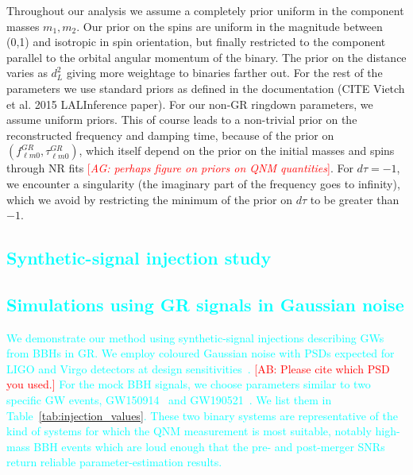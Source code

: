 \documentclass[twocolumn,prd,aps,superscriptaddress,preprintnumbers,tightenlines,showpacs,nofootinbib,eqsecnum,amsfonts,amsmath]{revtex4-1}
\newcommand{\abhi}[1]{\textcolor{red}{[\textit{AG: #1}]}}
\newcommand{\ab}[1]{\textcolor{cyan}{#1}}
\newcommand{\comment}[1]{\textcolor{red}{[#1]}}
\begin{document}
Throughout our analysis we assume a completely prior uniform in the component masses $m_1, m_2$. Our prior on the spins are uniform in the magnitude between (0,1) and isotropic in spin orientation, but finally restricted to the component parallel to the orbital angular momentum of the binary. The prior on the distance varies as $d_L^2$ giving more weightage to binaries farther out. For the rest of the parameters we use standard priors as defined in the documentation (CITE Vietch et al. 2015 LALInference paper). For our non-GR ringdown parameters, we assume uniform priors. This of course leads to a non-trivial prior on the reconstructed frequency and damping time, because of the prior on $( f_{\ell m 0}^{GR},\tau_{\ell m 0}^{GR})$, which itself depend on the prior on the initial masses and spins through NR fits \abhi{perhaps figure on priors on QNM quantities}. For $d\tau = -1$, we encounter a singularity (the imaginary part of the frequency goes to infinity), which we avoid by restricting the minimum of the prior on $d\tau$ to be greater than $-1$.
\fi

\ab{\section{Synthetic-signal injection study}}
\label{sec:results}

\subsection{\ab{Simulations using GR signals in Gaussian noise}} \label{ssec:gr_signal}

\ab{We demonstrate our method using synthetic-signal injections describing GWs 
from BBHs in GR. We employ coloured Gaussian noise with PSDs expected for LIGO and 
Virgo detectors at design sensitivities~\cite{}. \comment{AB: Please cite which PSD you used.} 
For the mock BBH signals, we choose parameters similar to two specific GW events, GW150914~\cite{} and 
GW190521~\cite{}. We list them in Table~\ref{tab:injection_values}. 
These two binary systems are representative of the kind of systems for which 
the QNM measurement is most suitable, notably high-mass BBH events which are loud enough that the  
pre- and post-merger SNRs return reliable parameter-estimation results.}
\end{document}
